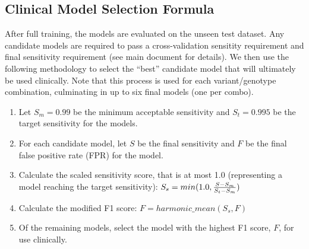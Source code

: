 \subsection{Clinical Model Selection Formula}
After full training, the models are evaluated on the unseen test dataset. Any candidate models are required to pass a cross-validation sensitity requirement and final sensitivity requirement (see main document for details). We then use the following methodology to select the ``best'' candidate model that will ultimately be used clinically.  Note that this process is used for each variant/genotype combination, culminating in up to six final models (one per combo).

\begin{enumerate}
    \item Let $S_m=0.99$ be the minimum acceptable sensitivity and $S_t=0.995$ be the target sensitivity for the models.
    \item For each candidate model, let $S$ be the final sensitivity and $F$ be the final false positive rate (FPR) for the model.
    \item Calculate the scaled sensitivity score, that is at most 1.0 (representing a model reaching the target sensitivity): $S_s = min(1.0, {S - S_m \over S_t - S_m})$
    \item Calculate the modified F1 score: $F = harmonic\_mean(S_s, F)$
    \item Of the remaining models, select the model with the highest F1 score, $F$, for use clinically.
\end{enumerate}
